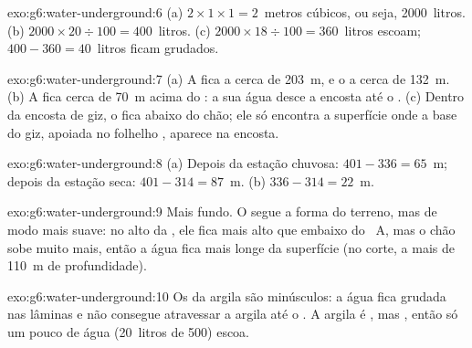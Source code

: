 \begin{solution}{exo:g6:water-underground:6}
(a) $2 \times 1 \times 1 = 2$~metros cúbicos, ou seja, 2000~litros.
(b) $2000 \times 20 \div 100 = 400$~litros. (c) $2000 \times 18 \div 100 =
360$~litros escoam; $400 - 360 = 40$~litros ficam grudados.
\end{solution}

\begin{solution}{exo:g6:water-underground:7}
(a) A  fica a cerca de 203~m, e o  a cerca de 132~m. (b) A 
fica cerca de 70~m acima do : a sua água desce a encosta até o .
(c) Dentro da encosta de giz, o  fica abaixo do chão; ele só
encontra a superfície onde a base do giz, apoiada no folhelho ,
aparece na encosta.
\end{solution}

\begin{solution}{exo:g6:water-underground:8}
(a) Depois da estação chuvosa: $401 - 336 = 65$~m; depois da estação seca:
$401 - 314 = 87$~m. (b) $336 - 314 = 22$~m.
\end{solution}

\begin{solution}{exo:g6:water-underground:9}
Mais fundo. O  segue a forma do terreno, mas de modo mais
suave: no alto da , ele fica mais alto que embaixo do ~A, mas o
chão sobe muito mais, então a água fica mais longe da superfície (no corte,
a mais de 110~m de profundidade).
\end{solution}

\begin{solution}{exo:g6:water-underground:10}
Os  da argila são minúsculos: a água fica grudada nas lâminas e não
consegue atravessar a argila até o . A argila é , mas
, então só um pouco de água (20~litros de 500) escoa.
\end{solution}

